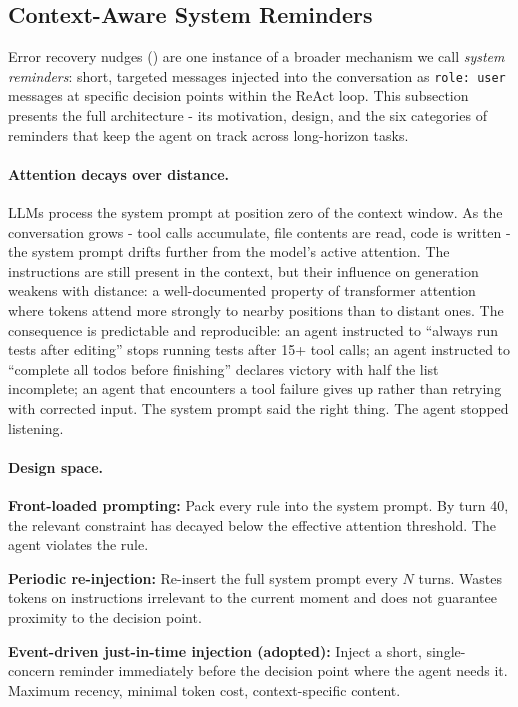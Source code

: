 \subsection{Context-Aware System Reminders}
\label{sec:system_reminders}

Error recovery nudges () are one instance of a broader mechanism we call \emph{system reminders}: short, targeted messages injected into the conversation as \texttt{role:~user} messages at specific decision points within the ReAct loop. This subsection presents the full architecture - its motivation, design, and the six categories of reminders that keep the agent on track across long-horizon tasks.

\paragraph{Attention decays over distance.} LLMs process the system prompt at position zero of the context window. As the conversation grows - tool calls accumulate, file contents are read, code is written - the system prompt drifts further from the model's active attention. The instructions are still present in the context, but their influence on generation weakens with distance: a well-documented property of transformer attention where tokens attend more strongly to nearby positions than to distant ones. The consequence is predictable and reproducible: an agent instructed to ``always run tests after editing'' stops running tests after 15+ tool calls; an agent instructed to ``complete all todos before finishing'' declares victory with half the list incomplete; an agent that encounters a tool failure gives up rather than retrying with corrected input. The system prompt said the right thing. The agent stopped listening.

\paragraph{Design space.}

\begin{packeditemize}
\item \textbf{Front-loaded prompting:} Pack every rule into the system prompt. By turn 40, the relevant constraint has decayed below the effective attention threshold. The agent violates the rule.

\item \textbf{Periodic re-injection:} Re-insert the full system prompt every $N$ turns. Wastes tokens on instructions irrelevant to the current moment and does not guarantee proximity to the decision point.

\item \textbf{Event-driven just-in-time injection (adopted):} Inject a short, single-concern reminder immediately before the decision point where the agent needs it. Maximum recency, minimal token cost, context-specific content.
\end{packeditemize}

